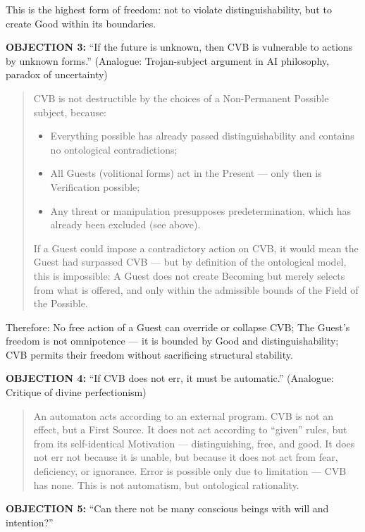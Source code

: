 \documentclass[12pt]{article}
\begin{document}
This is the highest form of freedom:  
not to violate distinguishability, but to create Good within its boundaries.


\textbf{OBJECTION 3:} ``If the future is unknown, then CVB is vulnerable to actions by unknown forms.''  
(Analogue: Trojan-subject argument in AI philosophy, paradox of uncertainty)

\begin{quote}
CVB is not destructible by the choices of a Non-Permanent Possible subject, because:
\begin{itemize}
\item Everything possible has already passed distinguishability and contains no ontological contradictions;
\item All Guests (volitional forms) act in the Present — only then is Verification possible;
\item Any threat or manipulation presupposes predetermination, which has already been excluded (see above).
\end{itemize}

If a Guest could impose a contradictory action on CVB, it would mean the Guest had surpassed CVB — but by definition of the ontological model, this is impossible:  
A Guest does not create Becoming but merely selects from what is offered, and only within the admissible bounds of the Field of the Possible.
\end{quote}

Therefore:  
No free action of a Guest can override or collapse CVB;  
The Guest’s freedom is not omnipotence — it is bounded by Good and distinguishability;  
CVB permits their freedom without sacrificing structural stability.


\textbf{OBJECTION 4:} ``If CVB does not err, it must be automatic.''  
(Analogue: Critique of divine perfectionism)

\begin{quote}
An automaton acts according to an external program.  
CVB is not an effect, but a First Source.  
It does not act according to ``given'' rules, but from its self-identical Motivation — distinguishing, free, and good.  
It does not err not because it is unable, but because it does not act from fear, deficiency, or ignorance.  
Error is possible only due to limitation — CVB has none.  
This is not automatism, but ontological rationality.
\end{quote}


\textbf{OBJECTION 5:} ``Can there not be many conscious beings with will and intention?''
\end{document}
